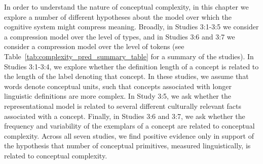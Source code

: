 In order to understand the nature of conceptual complexity, in this chapter we explore a number of different hypotheses about the model over which the cognitive system might compress meaning. Broadly, in Studies 3:1-3:5 we consider a compression model over the level of types, and in Studies 3:6 and 3:7 we consider a compression model over the level of tokens (see Table~\ref{tab:complexity_pred_summary_table} for a summary of the studies). In Studies 3:1-3:4, we explore whether the definition length of a concept  is related to the length of the label denoting that concept. In these studies, we assume that words denote conceptual units, such that concepts associated with longer linguistic definitions are  more complex. In Study 3:5, we ask whether the representational model is related to several different culturally relevant facts associated with a concept. Finally, in Studies 3:6 and 3:7, we ask whether the frequency and variability of the exemplars of a concept are related to conceptual complexity.  Across all seven studies, we find positive evidence only in support of the hypothesis that number of conceptual primitives, measured linguistically, is related to conceptual complexity.





 



